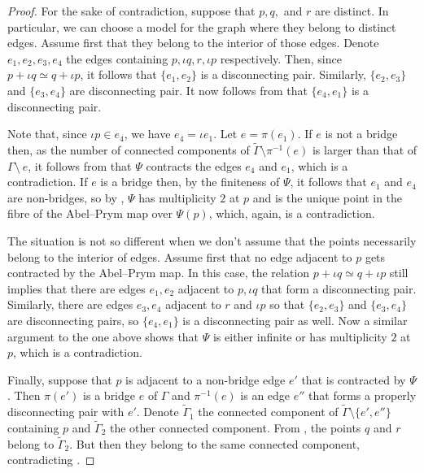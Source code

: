 \documentclass[11pt]{article}
\theoremstyle{definition}
\numberwithin{equation}{section}
\theoremstyle{definition}
\newcommand{\wt}[1]{\widetilde{#1}}
\begin{document}
\begin{proof}
For the sake of contradiction, suppose that $p,q,$ and $r$ are distinct. In particular, we can choose a model for the graph where they belong to distinct edges. Assume first that they belong to the interior of those edges. Denote $e_1,e_2,e_3,e_4$  the edges containing $p,\iota q,r,\iota p$ respectively. 
    Then, since $p+\iota q\simeq q+\iota p$, it follows that $\{e_1,e_2\}$ is a disconnecting pair. Similarly, $\{e_2, e_3\}$ and $\{e_3, e_4\}$ are disconnecting pair. It now follows from  that $\{e_4,e_1\}$ is a disconnecting pair. 
    
    Note that, since $\iota p\in e_4$, we have $e_4 = \iota e_1$. Let $e = \pi(e_1)$. If $e$ is not a bridge then, as the number of connected components of $\wt\Gamma\setminus\pi^{-1}(e)$ is larger than that of $\Gamma\setminus\ e$, it follows from  that $\Psi$ contracts the edges $e_4$ and $e_1$, which is a contradiction. If $e$ is a bridge then, by the finiteness of $\Psi$,  it follows that $e_1$ and $e_4$ are non-bridges,  so by , $\Psi$ has multiplicity $2$ at $p$ and is the unique point in the fibre of the Abel--Prym map over $\Psi(p)$, which, again, is a contradiction. 
    
    The situation is not so different when we don't assume that the points necessarily belong to the interior of edges. Assume first that no edge adjacent to $p$ gets contracted by the Abel--Prym map. 
    In this case,  the relation $p+\iota q\simeq q+\iota p$ still implies that there are edges $e_1,e_2$ adjacent to $p,\iota q$ that form a disconnecting pair. Similarly, there are edges $e_3,e_4$ adjacent to $r$ and $\iota p$ so that $\{e_2,e_3\}$ and $\{e_3,e_4\}$ are disconnecting pairs, so $\{e_4,e_1\}$ is a disconnecting pair as well. Now a similar argument to the one above shows that $\Psi$ is either infinite or has multiplicity $2$ at $p$, which is a contradiction.  

Finally, suppose that $p$ is adjacent to a non-bridge edge $e'$ that is contracted by $\Psi$. Then $\pi(e')$ is a bridge $e$ of $\Gamma$ and $\pi^{-1}(e)$ is an edge $e''$ that forms a properly disconnecting pair with $e'$. Denote $\wt\Gamma_1$ the connected component of $\wt\Gamma\setminus \{e',e''\}$ containing $p$ and $\wt\Gamma_2$ the other connected component. 
From , the points $q$ and $r$ belong to $\wt\Gamma_2$. But then they belong to the same connected component, contradicting . 
\end{proof}
\end{document}
